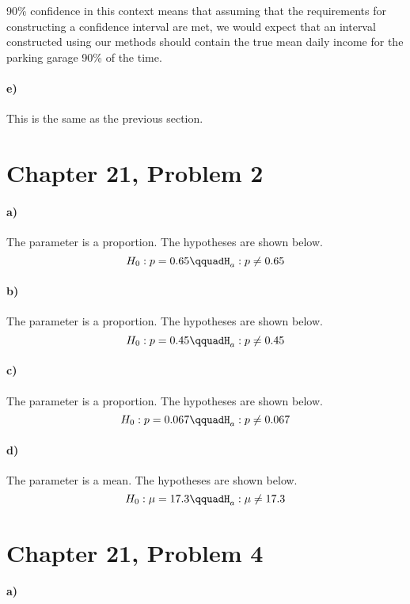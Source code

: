 \documentclass[12pt]{article}
\begin{document}
90\% confidence in this context means that assuming that the requirements for constructing a confidence interval are met,
we would expect that an interval constructed using our methods should contain the true mean daily income for the parking
garage 90\% of the time.

\paragraph{e)}

This is the same as the previous section.

\section*{Chapter 21, Problem 2}

\paragraph{a)}

The parameter is a proportion. The hypotheses are shown below.
\[H_0:p=0.65\qquadH_a:p\neq0.65\]

\paragraph{b)}

The parameter is a proportion. The hypotheses are shown below.
\[H_0:p=0.45\qquadH_a:p\neq0.45\]

\paragraph{c)}

The parameter is a proportion. The hypotheses are shown below.
\[H_0:p=0.067\qquadH_a:p\neq0.067\]

\paragraph{d)}

The parameter is a mean. The hypotheses are shown below.
\[H_0:\mu=17.3\qquadH_a:\mu\neq17.3\]

\section*{Chapter 21, Problem 4}

\paragraph{a)}
\end{document}
